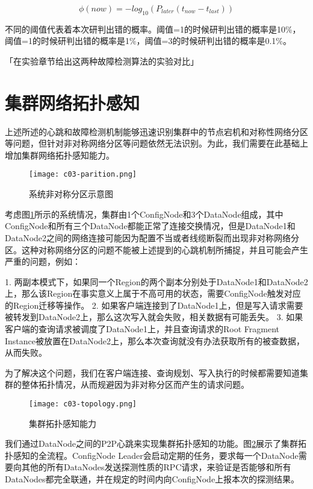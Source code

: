 $$ \phi(now) = -log_{10}(P_{later}(t_{now} - t_{last})) $$

不同的阈值代表着本次研判出错的概率。阈值=1的时候研判出错的概率是10\%，阈值=1的时候研判出错的概率是1\%，阈值=3的时候研判出错的概率是0.1\%。

「在实验章节给出这两种故障检测算法的实验对比」

\section{集群网络拓扑感知}

上述所述的心跳和故障检测机制能够迅速识别集群中的节点宕机和对称性网络分区等问题，但针对非对称网络分区等问题依然无法识别。为此，我们需要在此基础上增加集群网络拓扑感知能力。

\begin{figure}
  \centering
  \texttt{[image: c03-parition.png]}
  \caption{系统非对称分区示意图}
  \label{fig:c03-partition}
\end{figure}

考虑图\ref{fig:c03-partition}所示的系统情况，集群由1个ConfigNode和3个DataNode组成，其中ConfigNode和所有三个DataNode都能正常了连接交换情况，但是DataNode1和DataNode2之间的网络连接可能因为配置不当或者线缆断裂而出现非对称网络分区。这种对称网络分区的问题不能被上述提到的心跳机制所捕捉，并且可能会产生严重的问题，例如：

1. 两副本模式下，如果同一个Region的两个副本分别处于DataNode1和DataNode2上，那么该Region在事实意义上属于不高可用的状态，需要ConfigNode触发对应的Region迁移等操作。
2. 如果客户端连接到了DataNode1上，但是写入请求需要被转发到DataNode2上，那么这次写入就会失败，相关数据有可能丢失。
3. 如果客户端的查询请求被调度了DataNode1上，并且查询请求的Root Fragment Instance被放置在DataNode2上，那么本次查询就没有办法获取所有的被查数据，从而失败。

为了解决这个问题，我们在客户端连接、查询规划、写入执行的时候都需要知道集群的整体拓扑情况，从而规避因为非对称分区而产生的请求问题。

\begin{figure}
  \centering
  \texttt{[image: c03-topology.png]}
  \caption{集群拓扑感知能力}
  \label{fig:c03-topology}
\end{figure}

我们通过DataNode之间的P2P心跳来实现集群拓扑感知的功能。图\ref{fig:c03-topology}展示了集群拓扑感知的全流程。ConfigNode Leader会启动定期的任务，要求每一个DataNode需要向其他的所有DataNodes发送探测性质的RPC请求，来验证是否能够和所有DataNodes都完全联通，并在规定的时间内向ConfigNode上报本次的探测结果。

